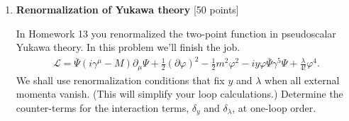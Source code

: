 \documentclass[12pt]{article}
\begin{document}
\begin{enumerate}
\vspace{.5em}


\item {\bf Renormalization of Yukawa theory} [50 points]

In Homework 13 you renormalized the two-point function in pseudoscalar Yukawa theory. In this problem we'll finish the job. 
\begin{align*}
\mathcal L = \bar\Psi (i\gamma^\mu-M) \partial_\mu \Psi + \frac 12 (\partial\varphi)^2 - \frac 12 m^2\varphi^2-iy\varphi\bar\Psi\gamma^5 \Psi + \frac{\lambda}{4!}\varphi^4.
\end{align*}
We shall use renormalization conditions that fix $y$ and $\lambda$ when all external momenta vanish. (This will simplify your loop calculations.) Determine the counter-terms for the interaction terms, $\delta_y$ and $\delta_\lambda$, at one-loop order.




\end{enumerate}
\end{document}
